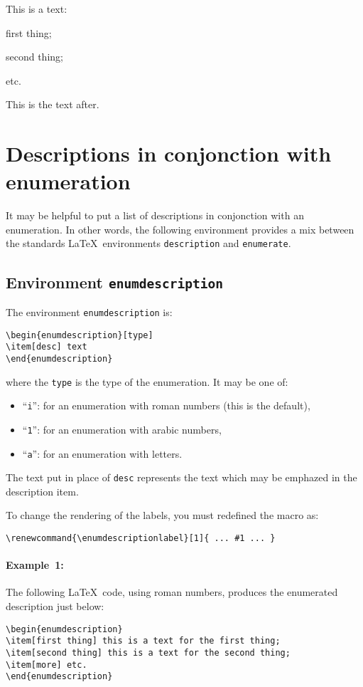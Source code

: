 \documentclass[book]{upmethodology-document}
\begin{document}
This is a text: \begin{inlineenumeration}
\item first thing;
\item second thing;
\item etc.
\end{inlineenumeration} This is the text after.

\section{Descriptions in conjonction with enumeration}

It may be helpful to put a list of descriptions in conjonction with an enumeration.
In other words, the following environment provides a mix between the standards \LaTeX~environments \texttt{description} and \texttt{enumerate}.

\subsection{Environment \texttt{enumdescription}}

The environment \texttt{enumdescription} is:
\begin{verbatim}
\begin{enumdescription}[type]
\item[desc] text
\end{enumdescription}
\end{verbatim}
where the \texttt{type} is the type of the enumeration. It may be one of:
\begin{itemize}
\item ``\texttt{i}'': for an enumeration with roman numbers (this is the default),
\item ``\texttt{1}'': for an enumeration with arabic numbers,
\item ``\texttt{a}'': for an enumeration with letters.
\end{itemize}
The text put in place of \texttt{desc} represents the text which may be emphazed in the description item.


To change the rendering of the labels, you must redefined the macro as:
\begin{verbatim}
\renewcommand{\enumdescriptionlabel}[1]{ ... #1 ... }
\end{verbatim}


\paragraph{Example~1:} The following \LaTeX~code, using roman numbers, produces the enumerated description just below:
\begin{verbatim}
\begin{enumdescription}
\item[first thing] this is a text for the first thing;
\item[second thing] this is a text for the second thing;
\item[more] etc.
\end{enumdescription}
\end{verbatim}
\end{document}
